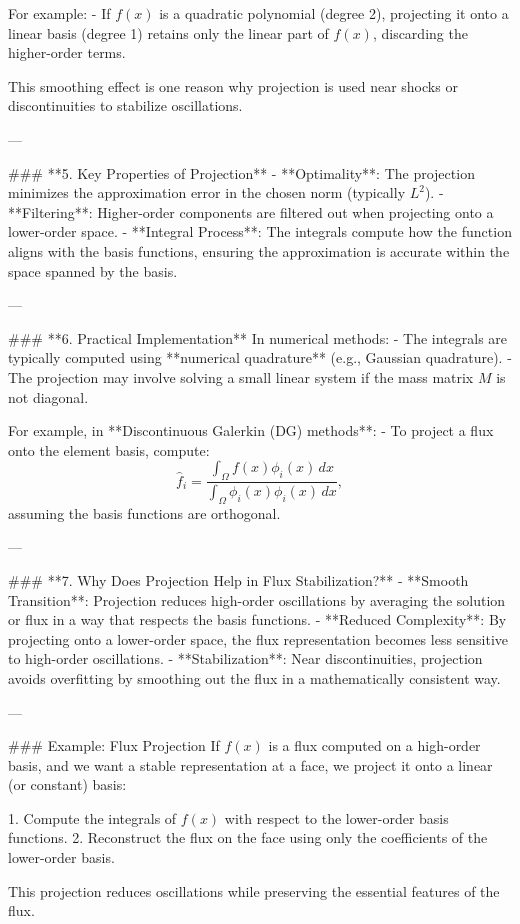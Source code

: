 For example:
- If \(f(x)\) is a quadratic polynomial (degree 2), projecting it onto a linear basis (degree 1) retains only the linear part of \(f(x)\), discarding the higher-order terms.

This smoothing effect is one reason why projection is used near shocks or discontinuities to stabilize oscillations.

---

### **5. Key Properties of Projection**
- **Optimality**: The projection minimizes the approximation error in the chosen norm (typically \(L^2\)).
- **Filtering**: Higher-order components are filtered out when projecting onto a lower-order space.
- **Integral Process**: The integrals compute how the function aligns with the basis functions, ensuring the approximation is accurate within the space spanned by the basis.

---

### **6. Practical Implementation**
In numerical methods:
- The integrals are typically computed using **numerical quadrature** (e.g., Gaussian quadrature).
- The projection may involve solving a small linear system if the mass matrix \(M\) is not diagonal.

For example, in **Discontinuous Galerkin (DG) methods**:
- To project a flux onto the element basis, compute:
  \[
  \hat{f}_i = \frac{\int_\Omega f(x) \phi_i(x) \, dx}{\int_\Omega \phi_i(x) \phi_i(x) \, dx},
  \]
  assuming the basis functions are orthogonal.

---

### **7. Why Does Projection Help in Flux Stabilization?**
- **Smooth Transition**: Projection reduces high-order oscillations by averaging the solution or flux in a way that respects the basis functions.
- **Reduced Complexity**: By projecting onto a lower-order space, the flux representation becomes less sensitive to high-order oscillations.
- **Stabilization**: Near discontinuities, projection avoids overfitting by smoothing out the flux in a mathematically consistent way.

---

### Example: Flux Projection
If \(f(x)\) is a flux computed on a high-order basis, and we want a stable representation at a face, we project it onto a linear (or constant) basis:

1. Compute the integrals of \(f(x)\) with respect to the lower-order basis functions.
2. Reconstruct the flux on the face using only the coefficients of the lower-order basis.

This projection reduces oscillations while preserving the essential features of the flux.

